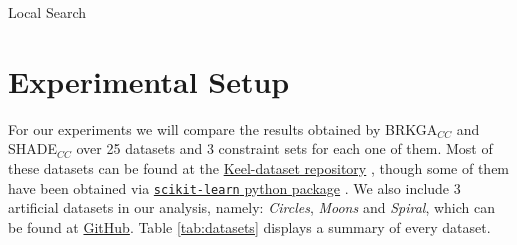 \documentclass[review]{elsarticle}
\begin{document}
\begin{algorithm}
	\SetNlSkip{0.5em}
	\BlankLine
	\BlankLine

\caption{Local Search}\label{alg:LS}
\end{algorithm}

\clearpage

\section{Experimental Setup} \label{sec:expSetup}

For our experiments we will compare the results obtained by BRKGA$_{CC}$ and SHADE$_{CC}$ over 25 datasets and 3 constraint sets for each one of them. Most of these datasets can be found at the \href{https://sci2s.ugr.es/keel/category.php?cat=clas}{Keel-dataset repository} \cite{triguero2017keel}, though some of them have been obtained via
\href{https://scikit-learn.org/stable/datasets/index.html}{\texttt{scikit-learn} python package} \cite{scikit-learn}. We also include 3 artificial datasets in our analysis, namely: \textit{Circles}, \textit{Moons} and \textit{Spiral}, which can be found at \href{https://github.com/GermangUgr/SHADE_CC}{GitHub}. Table \ref{tab:datasets} displays a summary of every dataset.
\end{document}
